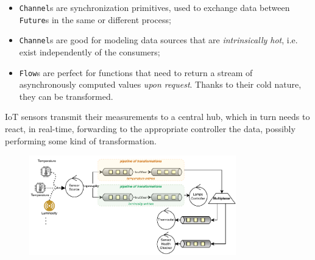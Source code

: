 \documentclass[aspectratio=1610,xcolor=dvipsnames]{beamer}
\begin{document}

\begin{frame}
  \begin{block}{}
      \begin{itemize}
          \item \texttt{Channel}s are synchronization primitives, used to exchange data between \texttt{Future}s in the same or different process;
          \item \texttt{Channel}s are good for modeling data sources that are \textit{intrinsically hot}, i.e. exist independently of the consumers;
          \item \texttt{Flow}s are perfect for functions that need to return a stream of asynchronously computed values \textit{upon request}. Thanks to their cold nature, they can be transformed.
      \end{itemize}
  \end{block}
\end{frame}


\begin{frame}
  \begin{example}[3]
      IoT sensors transmit their measurements to a central hub, which in turn needs to react, in real-time, forwarding to the appropriate controller the data, possibly performing some kind of transformation.
      \begin{figure}
          \centering
          \includegraphics[width=0.8\textwidth]{./images/iot.pdf}
      \end{figure}
  \end{example}
\end{frame}

\end{document}

